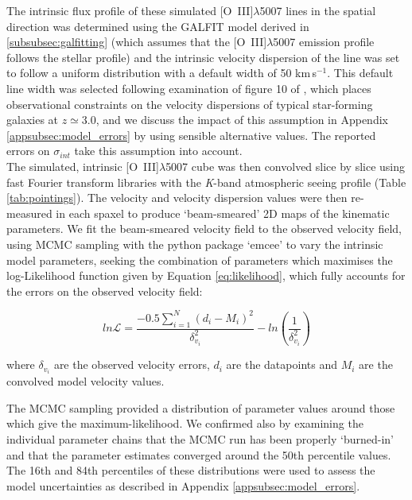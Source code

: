 \documentclass[fleqn,usenatbib]{mnras}
\newcommand{\Lagr}{\mathcal{L}}
\begin{document}
The intrinsic flux profile of these simulated [O~{\sc III}]$\lambda$5007 lines in the spatial direction was determined using the {\scriptsize GALFIT} model derived in \cref{subsubsec:galfitting} (which assumes that the [O~{\sc III}]$\lambda$5007 emission profile follows the stellar profile) and the intrinsic velocity dispersion of the line was set to follow a uniform distribution with a default width of 50 km\,s$^{-1}$.
This default line width was selected following examination of figure 10 of \cite{Wisnioski2015}, which places observational constraints on the velocity dispersions of typical star-forming galaxies at $z\simeq3.0$, and we discuss the impact of this assumption in Appendix \ref{appsubsec:model_errors} by using sensible alternative values.
The reported errors on $\sigma_{int}$ take this assumption into account. \\


The simulated, intrinsic [O~{\sc III}]$\lambda$5007 cube was then convolved slice by slice using fast Fourier transform libraries with the {\it K}-band atmospheric seeing profile (Table \ref{tab:pointings}).
The velocity and velocity dispersion values were then re-measured in each spaxel to produce `beam-smeared' 2D maps of the kinematic parameters.
We fit the beam-smeared velocity field to the observed velocity field, using MCMC sampling with the python package `emcee' \citep{Foreman-Mackey2013} to vary the intrinsic model parameters, seeking the combination of parameters which maximises the log-Likelihood function given by Equation \ref{eq:likelihood}, which fully accounts for the errors on the observed velocity field:

\begin{equation}\label{eq:likelihood}
   ln\Lagr = \frac{-0.5\sum_{i=1}^{N}(d_{i} - M_{i})^{2}}{\delta_{v_{i}}^{2}} - ln\left(\frac{1}{\delta_{v_{i}}^{2}}\right)
\end{equation}


where $\delta_{v_{i}}$ are the observed velocity errors, $d_{i}$ are the datapoints and $M_{i}$ are the convolved model velocity values.

The MCMC sampling provided a distribution of parameter values around those which give the maximum-likelihood.
We confirmed also by examining the individual parameter chains that the MCMC run has been properly `burned-in' and that the parameter estimates converged around the 50th percentile values.
The 16th and 84th percentiles of these distributions were used to assess the model uncertainties as described in Appendix \ref{appsubsec:model_errors}.
\end{document}
